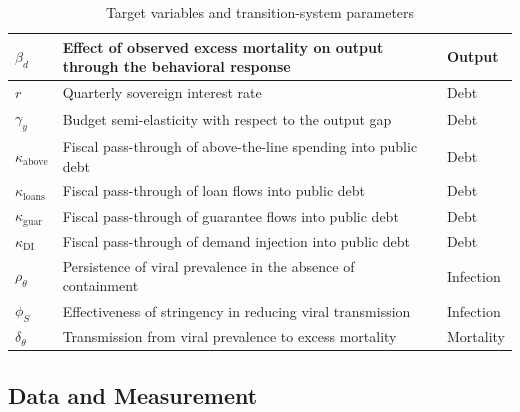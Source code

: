 \documentclass[12pt, a4paper]{article}
\begin{document}
\begin{table}[H]
\begin{tabular}{lp{9.5cm}l}
  $\beta_d$                
  & Effect of observed excess mortality on output through the behavioral response            
  & Output \\

  \midrule

  $r$                      
  & Quarterly sovereign interest rate                                  
  & Debt \\

  $\gamma_y$               
  & Budget semi-elasticity with respect to the output gap                    
  & Debt \\

  $\kappa_{\text{above}}$  
  & Fiscal pass-through of above-the-line spending into public debt                  
  & Debt \\

  $\kappa_{\text{loans}}$  
  & Fiscal pass-through of loan flows into public debt                        
  & Debt \\

  $\kappa_{\text{guar}}$   
  & Fiscal pass-through of guarantee flows into public debt                   
  & Debt \\

  $\kappa_{\text{DI}}$     
  & Fiscal pass-through of demand injection into public debt                        
  & Debt \\

  \midrule

  $\rho_\theta$            
  & Persistence of viral prevalence in the absence of containment                      
  & Infection \\

  $\phi_S$              
  & Effectiveness of stringency in reducing viral transmission                                       
  & Infection \\

  $\delta_\theta$          
  & Transmission from viral prevalence to excess mortality                                     
  & Mortality \\

  \bottomrule
  \end{tabular}

 \caption{Target variables and transition-system parameters}
\label{tab:planner_objects}
\end{table}



\subsection{Data and Measurement}
\label{sec:data}
\end{document}
